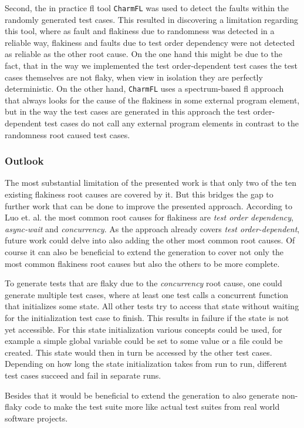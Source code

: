 \documentclass[
fancyheadings, %
%
%
]{stsreprt}
\begin{document}
Second, the in practice \acrshort{fl} tool \texttt{CharmFL} was used to detect the faults within the randomly generated test cases. 
This resulted in discovering a limitation regarding this tool, where as fault and flakiness due to randomness was detected in a reliable way, flakiness and faults due to test order dependency were not detected as reliable as the other root cause. On the one hand this might be due to the fact, that in the way we implemented the test order-dependent test cases the test cases themselves are not flaky, when view in isolation they are perfectly deterministic. On the other hand, \texttt{CharmFL} uses a spectrum-based \acrshort{fl} approach that always looks for the cause of the flakiness in some external program element, but in the way the test cases are generated in this approach the test order-dependent test cases do not call any external program elements in contrast to the randomness root caused test cases. 

\subsubsection{Outlook}
The most substantial limitation of the presented work is that only two of the ten existing flakiness root causes are covered by it. 
But this bridges the gap to further work that can be done to improve the presented approach. 
According to Luo et. al. \cite{luo:2014} the most common root causes for flakiness are \textit{test order dependency}, \textit{async-wait} and \textit{concurrency}. 
As the approach already covers \textit{test order-dependent}, future work could delve into also adding the other most common root causes. 
Of course it can also be beneficial to extend the generation to cover not only the most common flakiness root causes but also the others to be more complete. \par
To generate tests that are flaky due to the \textit{concurrency} root cause, one could generate multiple test cases, where at least one test calls a concurrent function that initializes some state. All other tests try to access that state without waiting for the initialization test case to finish. This results in failure if the state is not yet accessible. 
For this state initialization various concepts could be used, for example a simple global variable could be set to some value or a file could be created. This state would then in turn be accessed by the other test cases. 
Depending on how long the state initialization takes from run to run, different test cases succeed and fail in separate runs. \par
Besides that it would be beneficial to extend the generation to also generate non-flaky code  to make the test suite more like actual test suites from real world software projects.  
\appendix
\end{document}
